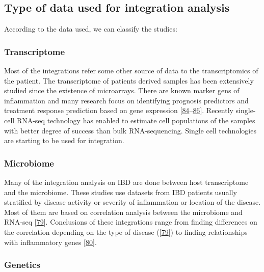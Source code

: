 \documentclass[
  a4paper,
]{book}
\begin{document}
\hypertarget{data-origin}{%
\subsection{Type of data used for integration analysis}\label{data-origin}}

According to the data used, we can classify the studies:

\hypertarget{transcriptome}{%
\subsubsection{Transcriptome}\label{transcriptome}}

Most of the integrations refer some other source of data to the transcriptomics of the patient.
The transcriptome of patients derived samples has been extensively studied since the existence of microarrays.
There are known marker gens of inflammation and many research focus on identifying prognosis predictors and treatment response prediction based on gene expression {[}\protect\hyperlink{ref-planell2013}{84}--\protect\hyperlink{ref-massimino2021}{86}{]}.
Recently single-cell RNA-seq technology has enabled to estimate cell populations of the samples with better degree of success than bulk RNA-sequencing.
Single cell technologies are starting to be used for integration.

\hypertarget{microbiome-1}{%
\subsubsection{Microbiome}\label{microbiome-1}}

Many of the integration analysis on IBD are done between host transcriptome and the microbiome.
These studies use datasets from IBD patients usually stratified by disease activity or severity of inflammation or location of the disease.
Most of them are based on correlation analysis between the microbiome and RNA-seq {[}\protect\hyperlink{ref-hasler_uncoupling_2016}{79}{]}.
Conclusions of these integrations range from finding differences on the correlation depending on the type of disease ({[}\protect\hyperlink{ref-hasler_uncoupling_2016}{79}{]}) to finding relationships with inflammatory genes {[}\protect\hyperlink{ref-tang2017}{80}{]}.

\hypertarget{genetics-1}{%
\subsubsection{Genetics}\label{genetics-1}}
\end{document}
